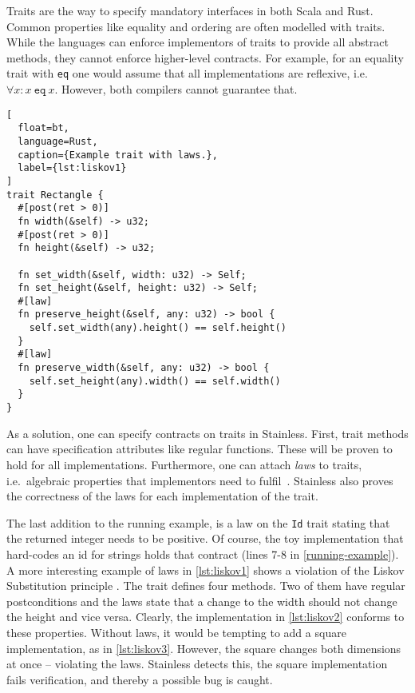 Traits are the way to specify mandatory interfaces in both Scala and Rust.
Common properties like equality and ordering are often modelled with traits.
While the languages can enforce implementors of traits to provide all abstract
methods, they cannot enforce higher-level contracts. For example, for an
equality trait with \texttt{eq} one would assume that all implementations are
reflexive, i.e. $\forall x: x~\mathtt{eq}~x$. However, both compilers cannot
guarantee that.

\begin{lstlisting}[
  float=bt,
  language=Rust,
  caption={Example trait with laws.},
  label={lst:liskov1}
]
trait Rectangle {
  #[post(ret > 0)]
  fn width(&self) -> u32;
  #[post(ret > 0)]
  fn height(&self) -> u32;

  fn set_width(&self, width: u32) -> Self;
  fn set_height(&self, height: u32) -> Self;
  #[law]
  fn preserve_height(&self, any: u32) -> bool {
    self.set_width(any).height() == self.height()
  }
  #[law]
  fn preserve_width(&self, any: u32) -> bool {
    self.set_height(any).width() == self.width()
  }
}
\end{lstlisting}


As a solution, one can specify contracts on traits in Stainless. First, trait
methods can have specification attributes like regular functions. These will be
proven to hold for all implementations. Furthermore, one can attach \emph{laws}
to traits, i.e.~algebraic properties that implementors need to
fulfil~\cite[section "Specifying Algebraic Properties"]{stainless-doc}.
Stainless also proves the correctness of the laws for each implementation of the
trait.

The last addition to the running example, is a law on the \lstinline!Id! trait
stating that the returned integer needs to be positive. Of course, the toy
implementation that hard-codes an id for strings holds that contract (lines 7-8
in \autoref{running-example}). A more interesting example of laws in
\autoref{lst:liskov1} shows a violation of the  Liskov Substitution principle
\cite{liskov}. The trait defines four methods. Two of them have regular
postconditions and the laws state that a change to the width should not change
the height and vice versa. Clearly, the implementation in \autoref{lst:liskov2}
conforms to these properties. Without laws, it would be tempting to add a square
implementation, as in \autoref{lst:liskov3}. However, the square changes both
dimensions at once -- violating the laws. Stainless detects this, the square
implementation fails verification, and thereby a possible bug is caught.

